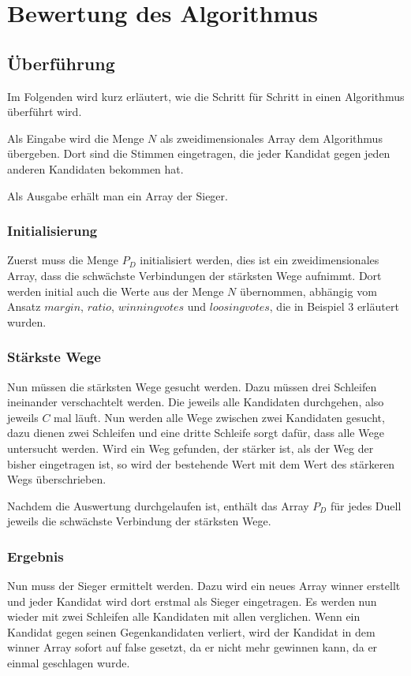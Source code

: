 \newpage
\section{Bewertung des Algorithmus}
\label{sec:Bewertung2}

\subsection{Überführung}
\label{sec:Ueberfuehrung}
Im Folgenden wird kurz erläutert, wie die \schulze Schritt für Schritt in einen Algorithmus überführt wird.

Als Eingabe wird die Menge $N$ als zweidimensionales Array dem Algorithmus übergeben. Dort sind die Stimmen eingetragen, die jeder Kandidat gegen jeden anderen Kandidaten bekommen hat.

Als Ausgabe erhält man ein Array der Sieger.

\subsubsection{Initialisierung}
\label{init}
Zuerst muss die Menge $P_{D}$ initialisiert werden, dies ist ein zweidimensionales Array, dass die schwächste Verbindungen der stärksten Wege aufnimmt. Dort werden initial auch die Werte aus der Menge $N$ übernommen, abhängig vom Ansatz $margin$, $ratio$, $winning votes$ und $loosing votes$, die in Beispiel 3 erläutert wurden.

\subsubsection{Stärkste Wege}
\label{starkeWege}
Nun müssen die stärksten Wege gesucht werden. Dazu müssen drei Schleifen ineinander verschachtelt werden. Die jeweils alle Kandidaten durchgehen, also jeweils $C$ mal läuft. Nun werden alle Wege zwischen zwei Kandidaten gesucht, dazu dienen zwei Schleifen und eine dritte Schleife sorgt dafür, dass alle Wege untersucht werden. Wird ein Weg gefunden, der stärker ist, als der Weg der bisher eingetragen ist, so wird der bestehende Wert mit dem Wert des stärkeren Wegs überschrieben.  

Nachdem die Auswertung durchgelaufen ist, enthält das Array $P_{D}$ für jedes Duell jeweils die schwächste Verbindung der stärksten Wege.

\subsubsection{Ergebnis}
Nun muss der Sieger ermittelt werden. Dazu wird ein neues Array winner erstellt und jeder Kandidat wird dort erstmal als Sieger eingetragen. Es werden nun wieder mit zwei Schleifen alle Kandidaten mit allen verglichen. Wenn ein Kandidat gegen seinen Gegenkandidaten verliert, wird der Kandidat in dem winner Array sofort auf false gesetzt, da er nicht mehr gewinnen kann, da er einmal geschlagen wurde. 

